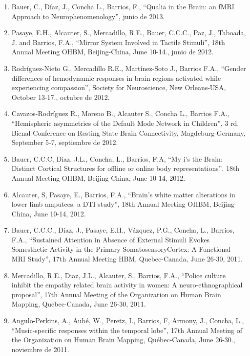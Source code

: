 \begin{enumerate}
\item Bauer, C., Díaz, J., Concha L., Barrios, F., “Qualia in the Brain: an fMRI Approach to Neurophenomenology”, junio de 2013.

\item Pasaye, E.H., Alcauter, S., Mercadillo, R.E., Bauer, C.C.C., Paz, J., Taboada, J. and Barrios, F.A., “Mirror System Involved in Tactile 
Stimuli”, 18th Annual Meeting OHBM, Beijing-China, June 10-14., junio de 2012.

\item Rodríguez-Nieto G., Mercadillo R.E., Martínez-Soto J., Barrios F.A., “Gender differences of hemodynamic responses in brain regions 
activated 
while experiencing compassion”, Society for Neuroscience, New Orleans-USA, October 13-17., octubre de 2012.

\item Cavazos-Rodríguez R., Moreno B., Alcauter S., Concha L., Barrios F.A., “Hemispheric asymmetries of the Default Mode Network in 
Children”, 3 
rd. Bienal Conference on Resting State Brain Connectivity, Magdeburg-Germany, September 5-7, septiembre de 2012.

\item Bauer, C.C.C, Díaz, J.L., Concha, L., Barrios, F.A, “My i's the Brain: Distinct Cortical Structures for offline or online body 
representations”, 18th Annual Meeting OHBM, Beijing-China, June 10-14, 2012.

\item Alcauter, S, Pasaye, E., Barrios, F.A., “Brain's white matter alterations in lower limb amputees: a DTI study”, 18th Annual Meeting 
OHBM, 
Beijing-China, June 10-14, 2012.

\item Bauer, C.C.C., Díaz, J., Pasaye, E.H., Vázquez, P.G., Concha, L., Barrios, F.A., “Sustained Attention in Absence of External Stimuli 
Evokes 
Somesthetic Activity in the Primary SomatosensoryCortex: A Functional MRI Study”, 17th Annual Meeting HBM, Quebec-Canada, June 26-30, 2011.

\item Mercadillo, R.E., Diaz, J.L., Alcauter, S., Barrios, F.A., “Police culture inhibit the empathy related brain activity in women: A 
neuro-ethnographical proposal”, 17th Annual Meeting of the Organization on Human Brain Mapping, Quebec-Canada, June 26-30, 2011.

\item Angulo-Perkins, A., Aubé, W., Peretz, I., Barrios, F, Armony, J., Concha, L., “Music-specific responses within the temporal lobe”, 17th 
Annual Meeting of the Organization on Human Brain Mapping, Québec-Canada, June 26-30., noviembre de 2011.


\end{enumerate}
